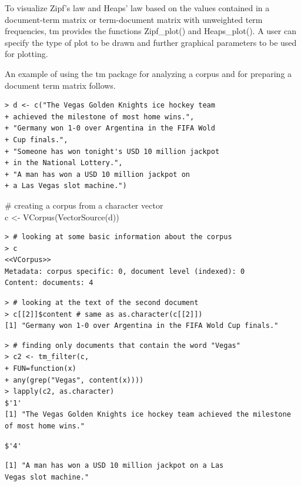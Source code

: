 \documentclass[10pt]{book}
\begin{document}
To visualize Zipf's law and Heaps' law based on the values contained in a document-term matrix or term-document matrix with unweighted term frequencies, tm provides the functions Zipf\_plot() and Heaps\_plot(). A user can specify the type of plot to be drawn and further graphical parameters to be used for plotting.

An example of using the tm package for analyzing a corpus and for preparing a document term matrix follows.

\begin{verbatim}
> d <- c("The Vegas Golden Knights ice hockey team
+ achieved the milestone of most home wins.",
+ "Germany won 1-0 over Argentina in the FIFA Wold
+ Cup finals.",
+ "Someone has won tonight's USD 10 million jackpot
+ in the National Lottery.",
+ "A man has won a USD 10 million jackpot on
+ a Las Vegas slot machine.")
\end{verbatim}

\begin{displayquote}
\# creating a corpus from a character vector\\
c <- VCorpus(VectorSource(d))
\end{displayquote}

\begin{verbatim}
> # looking at some basic information about the corpus
> c
<<VCorpus>>
Metadata: corpus specific: 0, document level (indexed): 0
Content: documents: 4
\end{verbatim}

\begin{verbatim}
> # looking at the text of the second document
> c[[2]]$content # same as as.character(c[[2]])
[1] "Germany won 1-0 over Argentina in the FIFA Wold Cup finals."
\end{verbatim}

\begin{verbatim}
> # finding only documents that contain the word "Vegas"
> c2 <- tm_filter(c,
+ FUN=function(x)
+ any(grep("Vegas", content(x))))
> lapply(c2, as.character)
$'1'
[1] "The Vegas Golden Knights ice hockey team achieved the milestone of most home wins."
\end{verbatim}

\begin{verbatim}
$'4'
\end{verbatim}

\begin{verbatim}
[1] "A man has won a USD 10 million jackpot on a Las
Vegas slot machine."
\end{verbatim}
\end{document}
